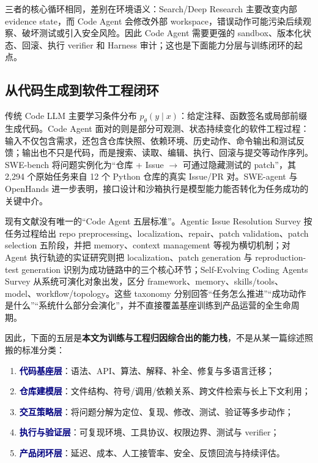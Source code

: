 \documentclass[10pt,a4paper,UTF8,fontset=none]{ctexart}
\newcommand{\stage}[1]{\textcolor{Navy}{\textbf{#1}}}
\begin{document}
三者的核心循环相同，差别在环境语义：Search/Deep Research 主要改变内部 evidence state，而 Code Agent 会修改外部 workspace，错误动作可能污染后续观察、破坏测试或引入安全风险。因此 Code Agent 需要更强的 sandbox、版本化状态、回滚、执行 verifier 和 Harness 审计；这也是下面能力分层与训练闭环的起点。

\subsection{从代码生成到软件工程闭环}

传统 Code LLM 主要学习条件分布 $p_\theta(y\mid x)$：给定注释、函数签名或局部前缀生成代码。Code Agent 面对的则是部分可观测、状态持续变化的软件工程过程：输入不仅包含需求，还包含仓库快照、依赖环境、历史动作、命令输出和测试反馈；输出也不只是代码，而是搜索、读取、编辑、执行、回滚与提交等动作序列。SWE-bench 将问题实例化为“仓库 + Issue $\rightarrow$ 可通过隐藏测试的 patch”，其 2,294 个原始任务来自 12 个 Python 仓库的真实 Issue/PR 对\cite{jimenez2024swebench}。SWE-agent 与 OpenHands 进一步表明，接口设计和沙箱执行是模型能力能否转化为任务成功的关键中介\cite{yang2024sweagent,wang2024openhands}。

现有文献没有唯一的“Code Agent 五层标准”。Agentic Issue Resolution Survey 按任务过程给出 repo preprocessing、localization、repair、patch validation、patch selection 五阶段，并把 memory、context management 等视为横切机制\cite{jiang2025agentsurvey}；对 Agent 执行轨迹的实证研究则把 localization、patch generation 与 reproduction-test generation 识别为成功链路中的三个核心环节\cite{ceka2025traceability}；Self-Evolving Coding Agents Survey 从系统可演化对象出发，区分 framework、memory、skills/tools、model、workflow/topology\cite{zhou2026selfevolving}。这些 taxonomy 分别回答“任务怎么推进”“成功动作是什么”“系统什么部分会演化”，并不直接覆盖基座训练到产品运营的全生命周期。

因此，下面的五层是\textbf{本文为训练与工程归因综合出的能力栈}，不是从某一篇综述照搬的标准分类：

\begin{enumerate}
  \item \stage{代码基座层}：语法、API、算法、解释、补全、修复与多语言迁移；
  \item \stage{仓库建模层}：文件结构、符号/调用/依赖关系、跨文件检索与长上下文利用；
  \item \stage{交互策略层}：将问题分解为定位、复现、修改、测试、验证等多步动作；
  \item \stage{执行与验证层}：可复现环境、工具协议、权限边界、测试与 verifier；
  \item \stage{产品闭环层}：延迟、成本、人工接管率、安全、反馈回流与持续评估。
\end{enumerate}
\end{document}
